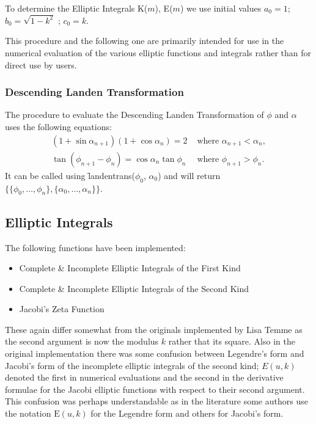 To determine the Elliptic Integrals K($m$), E($m$) we use initial values
\(a_0 = 1\); \(b_0 = \sqrt{1-k^2}\) ; \(c_0 = k\).

This procedure and the following one are primarily intended for use in the
numerical evaluation of the various elliptic functions and integrals rather
than for direct use by users.

\subsubsection{Descending Landen Transformation}
The procedure to evaluate the Descending Landen Transformation of
$\phi$ and $\alpha$ uses the following equations:
\begin{align*}
 (1+\sin \alpha_{n+1})(1+\cos \alpha_n)=2 &\text{ where } \alpha_{n+1}<\alpha_n, \\
  \tan(\phi_{n+1}-\phi_n)=\cos \alpha_n \tan \phi_n & \text{ where } \phi_{n+1}>\phi_n.
\end{align*}
It can be called using \f{landentrans}($\phi_0$, $\alpha_0$)
and will return \\
$\{\{\phi_0, \ldots ,\phi_n\},\{\alpha_0, \ldots ,\alpha_n\}\}$.

\subsection{Elliptic Integrals}
\hypertarget{ELLIPI}{}
The following functions have been implemented:

\begin{itemize}
\item Complete \& Incomplete Elliptic Integrals of the First Kind
\item Complete \& Incomplete Elliptic Integrals of the Second Kind
\item Jacobi's Zeta Function
\end{itemize}

These again differ somewhat from the originals implemented by Lisa Temme
as the second argument is now the modulus $k$ rather that its square.
Also in the original implementation  there was some confusion between
Legendre's form and Jacobi's form of the incomplete elliptic integrals of
the second kind; $E(u,k)$ denoted the first in numerical
evaluations and the second in the derivative formulae for the Jacobi
elliptic functions with respect to their second argument.
This confusion was perhaps understandable
as in the literature some authors use the notation $\mathrm{E}(u, k)$ for
the Legendre form and others for Jacobi's form.

